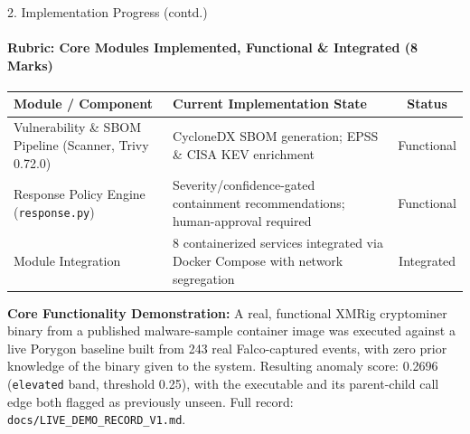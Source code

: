 \documentclass[aspectratio=169, 11pt]{beamer}
\begin{document}
\begin{frame}{2. Implementation Progress (contd.)}
    \framesubtitle{Rubric: Core Modules Implemented, Functional \& Integrated (8 Marks)}
    \begin{table}
        \centering
        \small
        \renewcommand{\arraystretch}{1.15}
        \begin{tabular}{|p{4.2cm}|p{5.8cm}|c|}
            \hline
            \textbf{Module / Component} & \textbf{Current Implementation State} & \textbf{Status} \\
            \hline
            Vulnerability \& SBOM Pipeline (Scanner, Trivy 0.72.0) & CycloneDX SBOM generation; EPSS \& CISA KEV enrichment & Functional \\
            \hline
            Response Policy Engine (\texttt{response.py}) & Severity/confidence-gated containment recommendations; human-approval required & Functional \\
            \hline
            Module Integration & 8 containerized services integrated via Docker Compose with network segregation & Integrated \\
            \hline
        \end{tabular}
    \end{table}
    \vspace{0.3cm}
    \footnotesize \textbf{Core Functionality Demonstration:} A real, functional
    XMRig cryptominer binary from a published malware-sample container image
    was executed against a live Porygon baseline built from 243 real
    Falco-captured events, with zero prior knowledge of the binary given to
    the system. Resulting anomaly score: 0.2696 (\texttt{elevated} band,
    threshold 0.25), with the executable and its parent-child call edge both
    flagged as previously unseen. Full record: \texttt{docs/LIVE\_DEMO\_RECORD\_V1.md}.
\end{frame}
\end{document}
